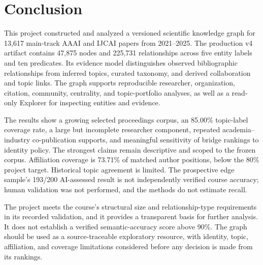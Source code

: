 \chapter{Conclusion}
\label{chap:conclusion}

This project constructed and analyzed a versioned scientific knowledge graph
for 13,617 main-track AAAI and IJCAI papers from 2021--2025. The production v4
artifact contains 47,875 nodes and 225,731 relationships across five entity
labels and ten predicates. Its evidence model distinguishes observed
bibliographic relationships from inferred topics, curated taxonomy, and derived
collaboration and topic links. The graph supports reproducible researcher,
organization, citation, community, centrality, and topic-portfolio analyses, as
well as a read-only Explorer for inspecting entities and evidence.

The results show a growing selected proceedings corpus, an 85.00\% topic-label
coverage rate, a large but incomplete researcher component, repeated
academia--industry co-publication supports, and meaningful sensitivity of bridge
rankings to identity policy. The strongest claims remain descriptive and scoped
to the frozen corpus. Affiliation coverage is 73.71\% of matched author
positions, below the 80\% project target. Historical topic agreement is limited.
The prospective edge sample's 193/200 AI-assessed result is not independently
verified course accuracy; human validation was not performed, and the methods do
not estimate recall.

The project meets the course's structural size and relationship-type requirements
in its recorded validation, and it provides a transparent basis for further
analysis. It does not establish a verified semantic-accuracy score above 90\%.
The graph should be used as a source-traceable exploratory resource, with
identity, topic, affiliation, and coverage limitations considered before any
decision is made from its rankings.

